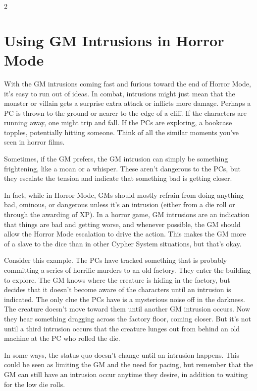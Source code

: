 \begin{multicols}{2}

\chapter{Using GM Intrusions in Horror Mode}

With the GM intrusions coming fast and furious toward the end of Horror Mode, it’s easy to run out of ideas. In combat, intrusions might just mean that the monster or villain gets a surprise extra attack or inflicts more damage. Perhaps a PC is thrown to the ground or nearer to the edge of a cliff. If the characters are running away, one might trip and fall. If the PCs are exploring, a bookcase topples, potentially hitting someone. Think of all the similar moments you’ve seen in horror films.

Sometimes, if the GM prefers, the GM intrusion can simply be something frightening, like a moan or a whisper. These aren’t dangerous to the PCs, but they escalate the tension and indicate that something bad is getting closer.

In fact, while in Horror Mode, GMs should mostly refrain from doing anything bad, ominous, or dangerous unless it’s an intrusion (either from a die roll or through the awarding of XP). In a horror game, GM intrusions are an indication that things are bad and getting worse, and whenever possible, the GM should allow the Horror Mode escalation to drive the action. This makes the GM more of a slave to the dice than in other Cypher System situations, but that’s okay.

Consider this example. The PCs have tracked something that is probably committing a series of horrific murders to an old factory. They enter the building to explore. The GM knows where the creature is hiding in the factory, but decides that it doesn’t become aware of the characters until an intrusion is indicated. The only clue the PCs have is a mysterious noise off in the darkness. The creature doesn’t move toward them until another GM intrusion occurs. Now they hear something dragging across the factory floor, coming closer. But it’s not until a third intrusion occurs that the creature lunges out from behind an old machine at the PC who rolled the die.

In some ways, the status quo doesn’t change until an intrusion happens. This could be seen as limiting the GM and the need for pacing, but remember that the GM can still have an intrusion occur anytime they desire, in addition to waiting for the low die rolls.


\end{multicols}
